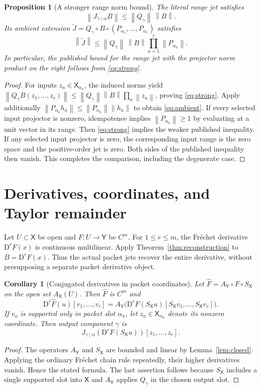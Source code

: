 \documentclass[11pt]{article}
\newtheorem{proposition}[theorem]{Proposition}
\newtheorem{corollary}[theorem]{Corollary}
\theoremstyle{remark}\newtheorem{remark}[theorem]{Remark}
\newcommand{\X}{\mathsf X}\newcommand{\Y}{\mathsf Y}\newcommand{\Z}{\mathsf Z}
\newcommand{\norm}[1]{\left\lVert#1\right\rVert}
\newcommand{\D}{\mathrm D}
\begin{document}
\begin{proposition}[A stronger range norm bound]\label{prop:norm}
The literal range jet satisfies
\begin{equation}\label{eq:strong}
\norm{J_{\gamma\mid\alpha}B}\le \norm{Q_\gamma}\,\norm{B}.
\end{equation}
Its ambient extension $\widetilde J=Q_\gamma\circ B\circ(P_{\alpha_1},\ldots,P_{\alpha_r})$ satisfies
\begin{equation}\label{eq:ambient}
\norm{\widetilde J}\le\norm{Q_\gamma}\,\norm{B}\prod_{a=1}^r\norm{P_{\alpha_a}}.
\end{equation}
In particular, the published bound for the range jet with the projector norm product on the right follows from \eqref{eq:strong}.
\end{proposition}
\begin{proof}
For inputs $z_a\in\X_{\alpha_a}$, the induced norms yield
$\norm{Q_\gamma B(z_1,\ldots,z_r)}\le\norm{Q_\gamma}\norm{B}\prod_a\norm{z_a}$, proving \eqref{eq:strong}. Apply additionally $\norm{P_{\alpha_a}h_a}\le\norm{P_{\alpha_a}}\norm{h_a}$ to obtain \eqref{eq:ambient}. If every selected input projector is nonzero, idempotence implies $\norm{P_{\alpha_a}}\ge1$ by evaluating at a unit vector in its range. Then \eqref{eq:strong} implies the weaker published inequality. If any selected input projector is zero, the corresponding input range is the zero space and the positive-order jet is zero. Both sides of the published inequality then vanish. This completes the comparison, including the degenerate case.
\end{proof}

\section{Derivatives, coordinates, and Taylor remainder}
Let $U\subset\X$ be open and $F:U\to\Y$ be $C^m$. For $1\le r\le m$, the Fr\'echet derivative $\D^rF(x)$ is continuous multilinear. Apply Theorem~\ref{thm:reconstruction} to $B=\D^rF(x)$. Thus the actual packet jets recover the entire derivative, without presupposing a separate packet derivative object.

\begin{corollary}[Conjugated derivatives in packet coordinates]\label{cor:conj}
Let $\widehat F=A_{\Y}\circ F\circ S_{\X}$ on the open set $A_{\X}(U)$. Then $\widehat F$ is $C^m$ and
\[
\D^r\widehat F(u)[v_1,\ldots,v_r]
=A_{\Y}\big(\D^rF(S_{\X}u)[S_{\X}v_1,\ldots,S_{\X}v_r]\big).
\]
If $v_a$ is supported only in packet slot $\alpha_a$, let $z_a\in\X_{\alpha_a}$ denote its nonzero coordinate. Then output component $\gamma$ is
\[
J_{\gamma\mid\alpha}(\D^rF(S_{\X}u))[z_1,\ldots,z_r].
\]
\end{corollary}
\begin{proof}
The operators $A_{\Y}$ and $S_{\X}$ are bounded and linear by Lemma~\ref{lem:closed}. Applying the ordinary Fr\'echet chain rule repeatedly, their higher derivatives vanish. Hence the stated formula. The last assertion follows because $S_{\X}$ includes a single supported slot into $\X$ and $A_{\Y}$ applies $Q_\gamma$ in the chosen output slot.
\end{proof}
\end{document}
